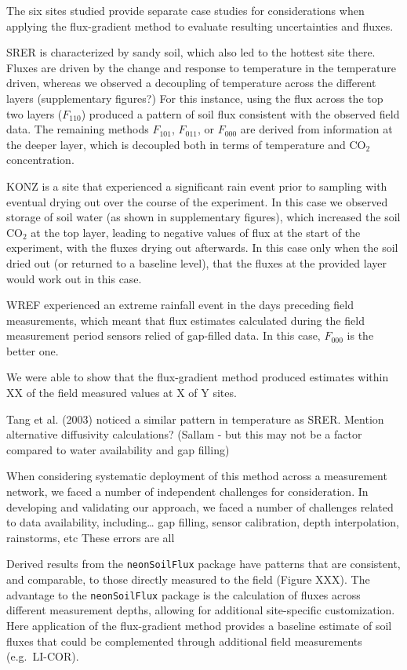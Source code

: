\documentclass[
  letterpaper,
  DIV=11,
  numbers=noendperiod]{scrartcl}
\begin{document}
The six sites studied provide separate case studies for considerations
when applying the flux-gradient method to evaluate resulting
uncertainties and fluxes.

SRER is characterized by sandy soil, which also led to the hottest site
there. Fluxes are driven by the change and response to temperature in
the temperature driven, whereas we observed a decoupling of temperature
across the different layers (supplementary figures?) For this instance,
using the flux across the top two layers (\(F_{110}\)) produced a
pattern of soil flux consistent with the observed field data. The
remaining methods \(F_{101}\), \(F_{011}\), or \(F_{000}\) are derived
from information at the deeper layer, which is decoupled both in terms
of temperature and CO\(_{2}\) concentration.

KONZ is a site that experienced a significant rain event prior to
sampling with eventual drying out over the course of the experiment. In
this case we observed storage of soil water (as shown in supplementary
figures), which increased the soil CO\(_{2}\) at the top layer, leading
to negative values of flux at the start of the experiment, with the
fluxes drying out afterwards. In this case only when the soil dried out
(or returned to a baseline level), that the fluxes at the provided layer
would work out in this case.

WREF experienced an extreme rainfall event in the days preceding field
measurements, which meant that flux estimates calculated during the
field measurement period sensors relied of gap-filled data. In this
case, \(F_{000}\) is the better one.

We were able to show that the flux-gradient method produced estimates
within XX of the field measured values at X of Y sites.

Tang et al. (2003) noticed a similar pattern in temperature as SRER.
Mention alternative diffusivity calculations? (Sallam - but this may not
be a factor compared to water availability and gap filling)

When considering systematic deployment of this method across a
measurement network, we faced a number of independent challenges for
consideration. In developing and validating our approach, we faced a
number of challenges related to data availability, including\ldots{} gap
filling, sensor calibration, depth interpolation, rainstorms, etc These
errors are all

Derived results from the \texttt{neonSoilFlux} package have patterns
that are consistent, and comparable, to those directly measured to the
field (Figure XXX). The advantage to the \texttt{neonSoilFlux} package
is the calculation of fluxes across different measurement depths,
allowing for additional site-specific customization. Here application of
the flux-gradient method provides a baseline estimate of soil fluxes
that could be complemented through additional field measurements
(e.g.~LI-COR).
\end{document}
